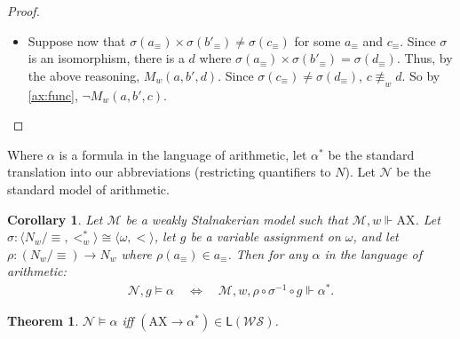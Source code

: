 \documentclass[12pt]{article}
\newtheorem{theorem}{Theorem}
\newtheorem{corollary}{Corollary}
\newcommand{\tup}[1]{\langle #1 \rangle}
\newcommand{\then}{\mathbin{\rightarrow}}
\newcommand{\Ax}{\text{AX}}
\begin{document}
\begin{proof}
\begin{enumerate}
\begin{enumerate}[label=(\roman*)]
\begin{itemize}
                \item[($\Rightarrow$)] Suppose now that $\sigma(a_\equiv) \times \sigma(b'_\equiv) \neq \sigma(c_\equiv)$ for some $a_\equiv$ and $c_\equiv$. 
                Since $\sigma$ is an isomorphism, there is a $d$ where $\sigma(a_\equiv) \times \sigma(b'_\equiv) = \sigma(d_\equiv)$. 
                Thus, by the above reasoning, $M_w(a,b',d)$. 
                Since $\sigma(c_\equiv) \neq \sigma(d_\equiv)$, $c \not\equiv_w d$. 
                So by \ref{ax:func}, $\neg M_w(a,b',c)$. 
            \end{itemize}
        \end{enumerate}
    \end{enumerate}
\end{proof}

Where $\alpha$ is a formula in the language of arithmetic, let $\alpha^*$ be the standard translation into our abbreviations (restricting quantifiers to $N$). 
Let $\mathcal{N}$ be the standard model of arithmetic. 

\begin{corollary}\label{main-cor}
    Let $\mathcal{M}$ be a weakly Stalnakerian model such that $\mathcal{M},w \Vdash \Ax$. 
    Let $\sigma\colon \tup{N_w/\equiv,<_w^*} \cong \tup{\omega,<}$, let $g$ be a variable assignment on $\omega$, and let $\rho\colon (N_w/\equiv) \rightarrow N_w$ where $\rho(a_\equiv) \in a_\equiv$. 
    Then for any $\alpha$ in the language of arithmetic:
    \begin{align*}
        \mathcal{N},g \vDash \alpha \quad\Leftrightarrow\quad \mathcal{M},w,\rho \circ \sigma^{-1} \circ g \Vdash \alpha^*.
    \end{align*}
\end{corollary}




\begin{theorem}\label{main}
    $\mathcal{N} \vDash \alpha$ iff $(\Ax \then \alpha^*) \in \mathsf{L}(\mathcal{WS})$.
\end{theorem}
\end{document}
